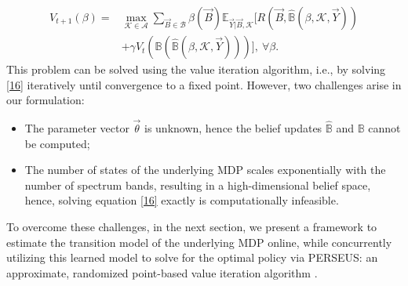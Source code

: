 \documentclass[10pt,twocolumn]{IEEEtran}
\begin{document}
\begin{align}\label{16}
\nonumber
    V_{t+1}(\beta) = &\max_{\mathcal{K} {\in} \mathcal{A}} \sum_{\vec{B} {\in} \mathcal{B}} \beta(\vec{B}) \mathbb{E}_{\vec{Y}|\vec{B}, \mathcal{K}} \Big[R(\vec{B}, \hat{\mathbb{B}}(\beta, \mathcal{K}, \vec{Y}))\\ &+\gamma V_{t}(\mathbb{B}(\hat{\mathbb{B}}(\beta, \mathcal{K}, \vec{Y})))\Big],\ \forall \beta.
\end{align}
This problem can be solved using the value iteration algorithm, i.e., by solving \eqref{16} iteratively until convergence to a fixed point. However, two challenges arise in our formulation:
\begin{itemize}
\item The parameter vector $\vec{\theta}$ is unknown, hence the belief updates 
$\hat{\mathbb B}$ and $\mathbb B$ cannot be computed;
\item The number of states of the underlying MDP scales exponentially with the number of spectrum bands, resulting in a high-dimensional belief space, hence, solving equation \eqref{16} exactly is computationally infeasible.
\end{itemize}
To overcome these challenges, in the next section, we present a framework to estimate the transition model of the underlying MDP online, while concurrently utilizing this learned model to solve for the optimal policy via PERSEUS: an approximate, randomized point-based value iteration algorithm \cite{DBLP:journals/corr/abs-1109-2145}.
\vspace{-3mm}
\end{document}
